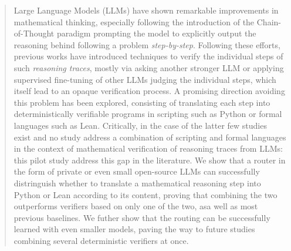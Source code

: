\begin{abstract}
Large Language Models (LLMs) have shown remarkable improvements in mathematical thinking, especially following the introduction of the Chain-of-Thought paradigm prompting the model to explicitly output the reasoning behind following a problem \emph{step-by-step}.
Following these efforts, previous works have introduced techniques to verify the individual steps of such \emph{reasoning traces}, mostly via asking another stronger LLM or applying supervised fine-tuning of other LLMs judging the individual steps, which itself lead to an opaque verification process. A promising direction avoiding this problem has been explored, consisting of translating each step into deterministically verifiable programs in scripting such as Python or formal languages such as Lean. Critically, in the case of the latter few studies exist and no study address a combination of scripting and formal languages in the context of mathematical verification of reasoning traces from LLMs: this pilot study address this gap in the literature. We show that a router in the form of private or even small open-source LLMs can successfully distringuish whether to translate a mathematical reasoning step into Python or Lean according to its content, proving that combining the two outperforms verifiers based on only one of the two, asa well as most previous baselines. We futher show that the routing can be successfully learned with even smaller models, paving the way to future studies combining several deterministic verifiers at once. 
\end{abstract}
